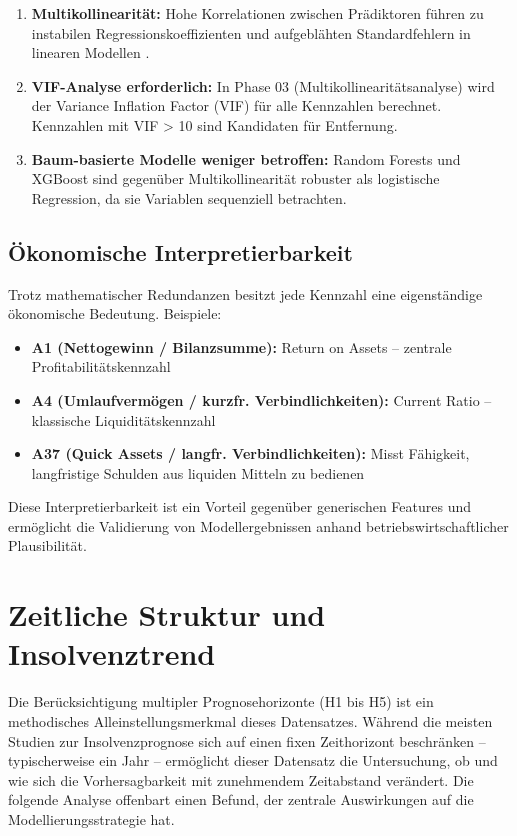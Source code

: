 \begin{enumerate}[topsep=0.2\baselineskip]
    \item \textbf{Multikollinearität:} Hohe Korrelationen zwischen Prädiktoren führen zu instabilen Regressionskoeffizienten und aufgeblähten Standardfehlern in linearen Modellen \parencite{hastieelementsstatistical2009}.
    
    \item \textbf{VIF-Analyse erforderlich:} In Phase 03 (Multikollinearitätsanalyse) wird der Variance Inflation Factor (VIF) für alle Kennzahlen berechnet. Kennzahlen mit VIF > 10 sind Kandidaten für Entfernung.
    
    \item \textbf{Baum-basierte Modelle weniger betroffen:} Random Forests und XGBoost sind gegenüber Multikollinearität robuster als logistische Regression, da sie Variablen sequenziell betrachten.
\end{enumerate}

\subsection{Ökonomische Interpretierbarkeit}

Trotz mathematischer Redundanzen besitzt jede Kennzahl eine eigenständige ökonomische Bedeutung. Beispiele:

\begin{itemize}[topsep=0.2\baselineskip]
    \item \textbf{A1 (Nettogewinn / Bilanzsumme):} Return on Assets – zentrale Profitabilitätskennzahl
    \item \textbf{A4 (Umlaufvermögen / kurzfr. Verbindlichkeiten):} Current Ratio – klassische Liquiditätskennzahl
    \item \textbf{A37 (Quick Assets / langfr. Verbindlichkeiten):} Misst Fähigkeit, langfristige Schulden aus liquiden Mitteln zu bedienen
\end{itemize}

Diese Interpretierbarkeit ist ein Vorteil gegenüber generischen Features und ermöglicht die Validierung von Modellergebnissen anhand betriebswirtschaftlicher Plausibilität.

\section{Zeitliche Struktur und Insolvenztrend}

Die Berücksichtigung multipler Prognosehorizonte (H1 bis H5) ist ein methodisches Alleinstellungsmerkmal dieses Datensatzes. Während die meisten Studien zur Insolvenzprognose sich auf einen fixen Zeithorizont beschränken – typischerweise ein Jahr \parencite{altman1968financial} – ermöglicht dieser Datensatz die Untersuchung, ob und wie sich die Vorhersagbarkeit mit zunehmendem Zeitabstand verändert. Die folgende Analyse offenbart einen Befund, der zentrale Auswirkungen auf die Modellierungsstrategie hat.


